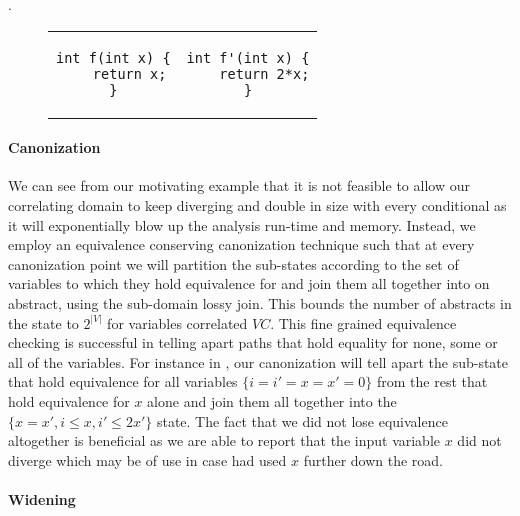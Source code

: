 .

\begin{figure}
\begin{tabular}{cc}
\centering
\begin{lstlisting}
int f(int x) {
    return x;
}
\end{lstlisting}
&
\begin{lstlisting}
int f'(int x) {
    return 2*x;
}
\end{lstlisting}
\end{tabular}
\end{figure}

\paragraph{Canonization}
We can see from our motivating example that it is not feasible to allow our correlating domain to keep diverging and double in size with every conditional as it will exponentially blow up the analysis run-time and memory. Instead, we employ an equivalence conserving canonization technique such that at every canonization point we will partition the sub-states according to the set of variables to which they hold equivalence for and join them all together into on abstract, using the sub-domain lossy join. This bounds the number of abstracts in the state to $2^{|V|}$ for variables correlated $VC$. This fine grained equivalence checking is successful in telling apart paths that hold equality for none, some or all of the variables. For instance in , our canonization will tell apart the sub-state that hold equivalence for all variables $\{i=i'=x=x'=0\}$ from the rest that hold equivalence for $x$ alone and join them all together into the $\{x=x',i \leq x, i' \leq 2x'\}$ state. The fact that we did not lose equivalence altogether is beneficial as we are able to report that the input variable $x$ did not diverge which may be of use in case  had used $x$ further down the road.

\paragraph{Widening}



